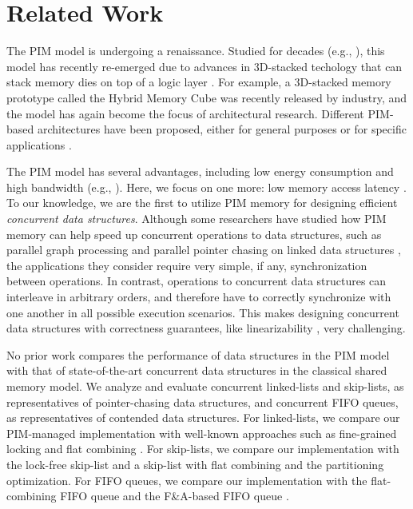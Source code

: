 \section{Related Work}
\label{section:related_work}
The PIM model is undergoing a renaissance. 
Studied for decades 
(e.g., \cite{Stone1970, Kogge1994, Gokhale1995, Patterson1997, Oskin1998, KangHYKGLTP99, Hall1999, Elliott:1992}), 
this model has recently re-emerged due to advances in 3D-stacked techology that 
can stack memory dies on top of a logic layer \cite{jeddeloh2012, Loh2008, Black2006, Kim2014HotChip}. 
For example, a 3D-stacked memory prototype called the Hybrid Memory Cube \cite{website:HMC} 
was recently released by industry, and the model has again become the focus of architectural research.
Different PIM-based architectures have been proposed, either for general purposes or for 
specific applications \cite{Ahn2015:1, Ahn2015:2, Zhang2014:TTP, hsieh2016accelerating,
Azarkhish16, Akin2015:DRM, Azarkhish2015, AzarkhishPRLB17, boroumand2016, ZhuASSHPF13, ZhuGSPF13, Seshadri:2015, 
Hashemi:2016, Hsieh:2016:TOM, Seshadri:2013}.

The PIM model has several advantages, including low energy consumption and high bandwidth 
(e.g., \cite{Ahn2015:2, Zhang2014:TTP, ZhuASSHPF13, AzarkhishPRLB17}). 
Here, we focus on one more: low memory access latency 
\cite{Loh2008, hsieh2016accelerating, Azarkhish16, Hashemi:2016}.
To our knowledge, we are the first to utilize PIM memory for designing efficient \emph{concurrent data structures}. 
Although some researchers have studied how PIM memory can help speed up concurrent 
operations to data structures, such as parallel graph processing \cite{Ahn2015:2} and  
parallel pointer chasing on linked data structures \cite{hsieh2016accelerating}, 
the applications they consider require very simple, if any, synchronization between operations. 
In contrast, operations to concurrent data structures can interleave in arbitrary orders, 
and therefore have to correctly synchronize with one another in all possible execution scenarios. 
This makes designing concurrent data structures with correctness guarantees, like 
linearizability \cite{Herlihy90}, very challenging. 

No prior work compares the performance of data structures in the PIM model 
with that of state-of-the-art concurrent data structures in the classical shared memory model. 
We analyze and evaluate concurrent linked-lists and skip-lists, 
as representatives of pointer-chasing data structures, and concurrent FIFO queues, 
as representatives of contended data structures.
For linked-lists, we compare our PIM-managed implementation with well-known approaches 
such as fine-grained locking \cite{Heller05} and flat combining 
\cite{Hendler10, Fatourou12, Hendler:2010:DISC}.
For skip-lists, we compare our implementation with the lock-free skip-list \cite{Herlihy08} 
and a skip-list with flat combining and the partitioning optimization. 
For FIFO queues, we compare our implementation with the flat-combining FIFO queue 
\cite{Hendler10} and the F\&A-based FIFO queue \cite{Morrison13}. 